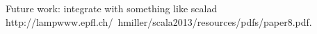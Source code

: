 \documentclass[9pt,preprint]{sigplanconf}
\begin{document}
 Future work: integrate with something like scalad http://lampwww.epfl.ch/~hmiller/scala2013/resources/pdfs/paper8.pdf.







\end{document}
